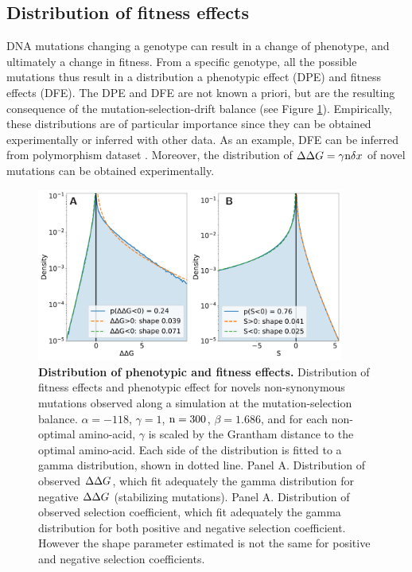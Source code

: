 \documentclass{article}
\begin{document}
\subsection*{Distribution of fitness effects}
DNA mutations changing a genotype can result in a change of phenotype, and ultimately a change in fitness.
From a specific genotype, all the possible mutations thus result in a distribution a phenotypic effect (DPE) and fitness effects (DFE).
The DPE and DFE are not known a priori, but are the resulting consequence of the mutation-selection-drift balance (see Figure \ref{fig:Distribution}).
Empirically, these distributions are of particular importance since they can be obtained experimentally or inferred with other data.
As an example, DFE can be inferred from polymorphism dataset \cite{Eyre-walker2007, Galtier2016}. 
Moreover, the distribution of $\Delta \Delta G=\gamma \text{n} \delta x$ of novel mutations can be obtained experimentally.
\begin{figure}[htb!]
 \begin{mdframed}
  \centering
  \includegraphics[width=0.9\textwidth] {artworks/DPE-DFE.pdf}
  \caption{
   \textbf{Distribution of phenotypic and fitness effects.}
   Distribution of fitness effects and phenotypic effect for novels non-synonymous mutations observed along a simulation at the mutation-selection balance. $\alpha=-118$, $\gamma=1$, $\text{n}=300$, $\beta=1.686$, and for each non-optimal amino-acid, $\gamma$ is scaled by the Grantham distance to the optimal amino-acid.
   Each side of the distribution is fitted to a gamma distribution, shown in dotted line. 
   Panel A. Distribution of observed $\Delta \Delta G$, which fit adequately the gamma distribution for negative $\Delta \Delta G$ (stabilizing mutations). 
   Panel A. Distribution of observed selection coefficient, which fit adequately the gamma distribution for both positive and negative selection coefficient. However the shape parameter estimated is not the same for positive and negative selection coefficients. 
  }
  \label{fig:Distribution}
 \end{mdframed}
\end{figure}
\end{document}
